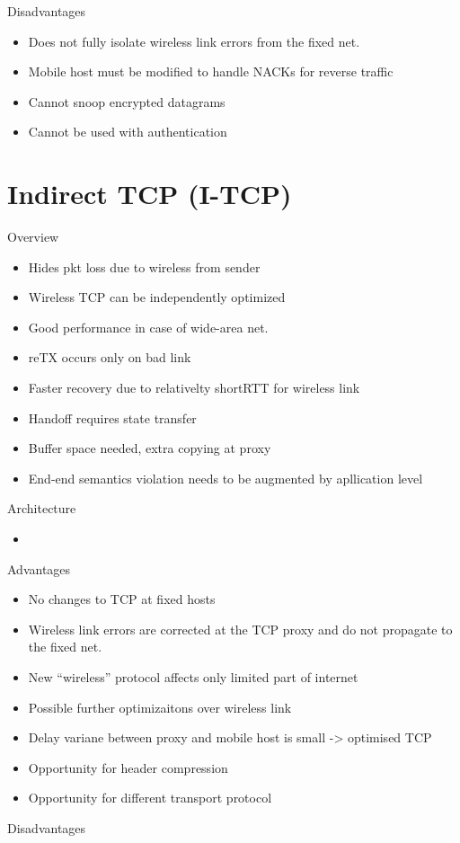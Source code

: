 Disadvantages
\begin{itemize}
	\item Does not fully isolate wireless link errors from the fixed net.
	\item Mobile host must be modified to handle NACKs for reverse traffic
	\item Cannot snoop encrypted datagrams
	\item Cannot be used with authentication
\end{itemize}
\section{Indirect TCP (I-TCP)}
Overview
\begin{itemize}
	\item Hides pkt loss due to wireless from sender
	\item Wireless TCP can be independently optimized
	\item Good performance in case of wide-area net.
	\item reTX occurs only on bad link
	\item Faster recovery due to relativelty shortRTT for wireless link
	\item Handoff requires state transfer
	\item Buffer space needed, extra copying at proxy
	\item End-end semantics violation needs to be augmented by apllication
		level
\end{itemize}
Architecture
\begin{itemize}
	\item
\end{itemize}
Advantages
\begin{itemize}
	\item No changes to TCP at fixed hosts
	\item Wireless link errors are corrected at the TCP proxy and do not
		propagate to the fixed net.
	\item New ``wireless'' protocol affects only limited part of internet
	\item Possible further optimizaitons over wireless link
	\item Delay variane between proxy and mobile host is small -> optimised
		TCP
	\item Opportunity for header compression
	\item Opportunity for different transport protocol
\end{itemize}
Disadvantages
